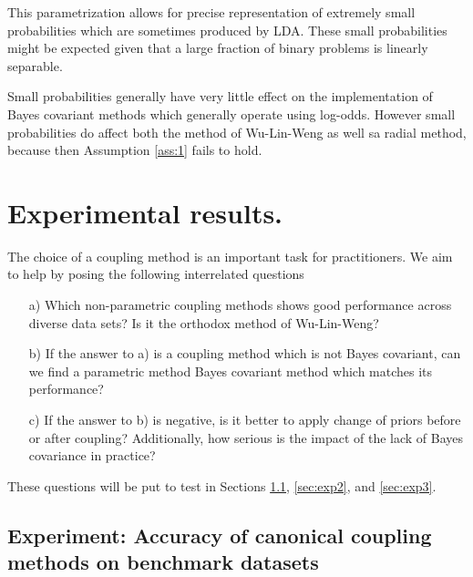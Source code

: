 This parametrization allows for precise representation of extremely small probabilities which are sometimes produced by LDA. These small probabilities might be expected given that a large fraction of binary problems is linearly separable. 

Small probabilities generally have very little effect on the implementation of Bayes covariant methods which generally operate using log-odds. However small probabilities do affect both the method of Wu-Lin-Weng as well sa radial method, because then Assumption \ref{ass:1} fails to hold. 


\section{Experimental results.}

The choice of a coupling method is an important task for practitioners. We aim to help by posing the following interrelated questions 

\begin{itemize}
\item[a)] Which non-parametric coupling methods shows good performance across diverse data sets? Is it the orthodox method of Wu-Lin-Weng?
\item[b)] If the answer to a) is a coupling method which is not Bayes covariant, can we find a parametric method Bayes covariant method which  matches its performance?
\item[c)] If the answer to b) is negative, is it better to apply change of priors before or after coupling? Additionally, how serious is the impact of the lack of Bayes covariance in practice?
\end{itemize}

These questions will be put to test in Sections \ref{sec:exp1}, \ref{sec:exp2}, and \ref{sec:exp3}.



\subsection{Experiment: Accuracy of canonical coupling methods on benchmark datasets} \label{sec:exp1}

